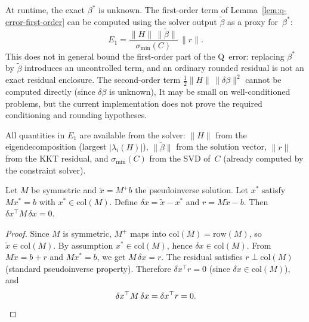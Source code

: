 \begin{remark}\label{rem:runtime-q-bound}
At runtime, the exact $\beta^*$ is unknown.
The first-order term of Lemma~\ref{lem:q-error-first-order}
can be computed using the solver output $\tilde\beta$
as a proxy for~$\beta^*$:
\[
  E_1 = \frac{\|H\|\,\|\tilde\beta\|}{\sigma_{\min}(C)}\,\|r\|.
\]
This does not in general bound the first-order part of the Q~error: replacing
\(\beta^*\) by \(\tilde\beta\) introduces an uncontrolled term, and an ordinary
rounded residual is not an exact residual enclosure.
The second-order term $\tfrac{1}{2}\|H\|\,\|\delta\beta\|^2$
cannot be computed directly (since $\delta\beta$ is unknown),
It may be small on well-conditioned problems, but the current implementation
does not prove the required conditioning and rounding hypotheses.


All quantities in $E_1$ are available from the solver:
$\|H\|$ from the eigendecomposition (largest $|\lambda_i(H)|$),
$\|\tilde\beta\|$ from the solution vector,
$\|r\|$ from the KKT residual, and
$\sigma_{\min}(C)$ from the SVD of~$C$
(already computed by the constraint solver).

\end{remark}


\begin{lemma}\label{lem:pseudoinverse-orthogonality}
Let $M$ be symmetric and $\tilde x = M^+ b$ the pseudoinverse solution.
Let $x^*$ satisfy $M x^* = b$ with $x^* \in \mathrm{col}(M)$.
Define $\delta x = \tilde x - x^*$ and $r = M\tilde x - b$.
Then $\delta x^\top M\, \delta x = 0$.
\end{lemma}

\begin{proof}
Since $M$ is symmetric, $M^+$ maps into $\mathrm{col}(M) = \mathrm{row}(M)$,
so $\tilde x \in \mathrm{col}(M)$. By assumption $x^* \in \mathrm{col}(M)$,
hence $\delta x \in \mathrm{col}(M)$.
From $M\tilde x = b + r$ and $M x^* = b$, we get $M\,\delta x = r$.
The residual satisfies $r \perp \mathrm{col}(M)$ (standard pseudoinverse property).
Therefore $\delta x^\top r = 0$ (since $\delta x \in \mathrm{col}(M)$), and
\[
  \delta x^\top M\,\delta x = \delta x^\top r = 0. \qedhere
\]
\end{proof}


